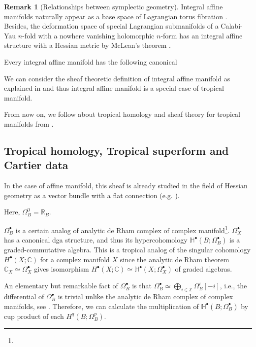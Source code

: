 \documentclass[a4paper,dvipdfmx,reqno,12pt]{amsart}
\theoremstyle{definition}
\newtheorem{Rmk}[Thm]{Remark}
\newcommand{\C}{\mathbb{C}}%
\newcommand{\R}{\mathbb{R}}%
\newcommand{\Z}{\mathbb{Z}}%
\newcommand{\mb}[1]{\mathbb{#1}}%
\numberwithin{equation}{section}
\begin{document}
\begin{Rmk}[{Relationships between symplectic geometry}]
Integral affine manifolds naturally appear 
as a base space of Lagrangian torus fibration 
\cite{duistermaatGlobalActionangleCoordinates1980a}. 
Besides, the deformation space of 
special Lagrangian submanifolds of
a Calabi-Yau $n$-fold with a nowhere vanishing 
holomorphic $n$-form has 
an integral affine structure with 
a Hessian metric by McLean's theorem \cite{MR1664890}.

Every integral affine manifold has the following canonical
\end{Rmk}

We can consider the sheaf theoretic definition of 
integral affine manifold as explained 
in \cite[2.1]{kontsevichAffineStructuresNonArchimedean2006a} 
and thus integral affine manifold is a special case of 
tropical manifold.

From now on, we follow about tropical homology and sheaf 
theory for tropical manifolds
from \cite{MR3903579,gross2019sheaftheoretic}.

\subsection{Tropical homology, Tropical superform and Cartier data}

In the case of affine manifold, this sheaf is already
studied in the field of Hessian geometry as a vector bundle
with a flat connection
(e.g. \cite[Chapter 7]{MR2293045}).


Here, $\Omega_B^{0}=\R_B$.

$\Omega_B^{\bullet}$ is a certain analog of analytic
de Rham complex of complex manifold\footnote{
}.
$\Omega_X^{\bullet}$ has a canonical dga structure, 
and thus its hypercohomology 
$\mb{H}^{\bullet}(B;\Omega_B^{\bullet})$ is a 
graded-commutative algebra. 
This is a tropical analog of the singular cohomology
$H^{\bullet}(X;\C)$ for a complex manifold $X$ since 
the analytic de Rham theorem $\C_X \simeq \Omega_X^{\bullet}$ 
gives isomorphism 
$H^{\bullet}(X;\C)\simeq \mb{H}^{\bullet}(X;\Omega_X^{\bullet})$
of graded algebras. 

An elementary but remarkable fact of 
$\Omega_B^{\bullet}$ is that $\Omega_B^{\bullet}\simeq 
\bigoplus_{i\in \Z}\Omega_B^{i}[-i]$, i.e., the differential 
of $\Omega_B^{\bullet}$ is trivial unlike the analytic de Rham complex
of complex manifolds, see \cite[Corollary 2.15]{epub36262}.
Therefore, we can calculate the multiplication of 
$\mb{H}^{\bullet}(B;\Omega_B^{\bullet})$ by 
cup product of each $H^{q}(B;\Omega_B^{p})$.
\end{document}
